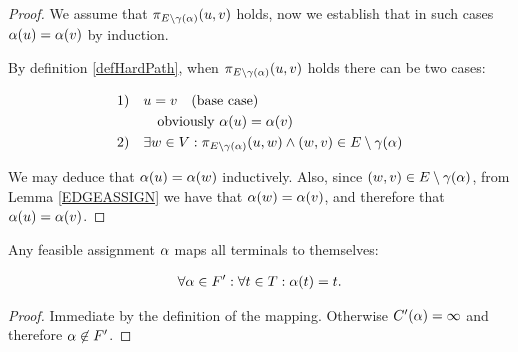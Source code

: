 \begin{proof}
We assume that $\pi_{E \setminus \gamma(\alpha)}(u, v)$ holds, now we establish that in such cases $\alpha(u) = \alpha(v)$ by induction.

By definition \ref{defHardPath}, when $\pi_{E \setminus \gamma(\alpha)}(u, v)$ holds there can be two cases:

\begin{align}
	\nonumber \mbox{1)} \quad & u = v \quad \mbox{(base case)} \\
	\nonumber & \quad \mbox{obviously $\alpha(u) = \alpha(v)$} \\
	\nonumber \mbox{2)} \quad & \exists w \in V: \pi_{E \setminus \gamma(\alpha)}(u, w) \wedge (w, v) \in E \setminus \gamma(\alpha)
\end{align}

\noindent We may deduce that $\alpha(u) = \alpha(w)$ inductively.
Also, since $(w, v) \in E \setminus \gamma(\alpha)$, from Lemma \ref{EDGEASSIGN} we have that $\alpha(w) = \alpha(v)$, and therefore that $\alpha(u) = \alpha(v)$.
\end{proof}

\begin{lemma}
\label{FORCEASSIGN}
Any feasible assignment $\alpha$ maps all terminals to themselves:

\begin{align}
	\nonumber \forall \alpha \in F' : \forall t \in T : \alpha(t) = t.
\end{align}
\end{lemma}

\begin{proof}
Immediate by the definition of the mapping.
Otherwise $C'(\alpha) = \infty$ and therefore $\alpha \not\in F'$.
\end{proof}

